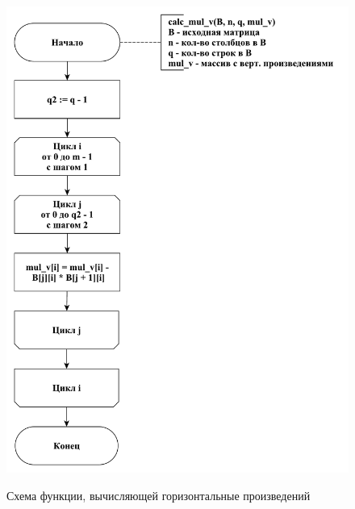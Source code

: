 \documentclass[a4paper,12pt]{article}
\begin{document}
	    	    \begin{figure}[h!]
	    	\begin{center}
	    		{\includegraphics[scale = 0.5]{schema03.pdf}}
	    		\caption{Схема функции, вычисляющей горизонтальные произведений}
	    		\label{fig:schema_v}
	    	\end{center}
	    \end{figure}
	    
\end{document}

